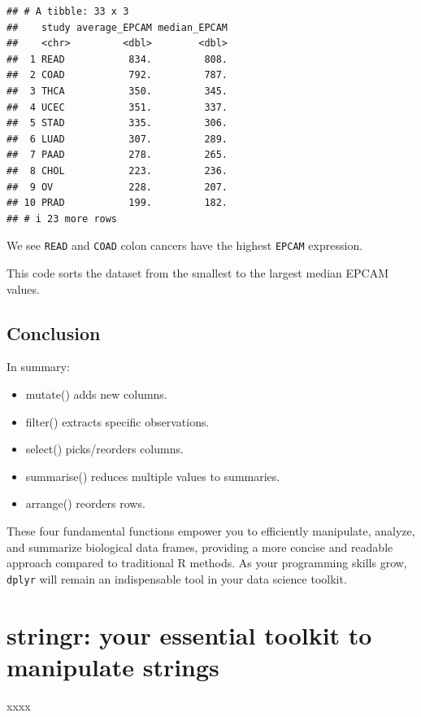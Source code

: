 \documentclass[
]{book}
\begin{document}
\begin{verbatim}
## # A tibble: 33 x 3
##    study average_EPCAM median_EPCAM
##    <chr>         <dbl>        <dbl>
##  1 READ           834.         808.
##  2 COAD           792.         787.
##  3 THCA           350.         345.
##  4 UCEC           351.         337.
##  5 STAD           335.         306.
##  6 LUAD           307.         289.
##  7 PAAD           278.         265.
##  8 CHOL           223.         236.
##  9 OV             228.         207.
## 10 PRAD           199.         182.
## # i 23 more rows
\end{verbatim}

We see \texttt{READ} and \texttt{COAD} colon cancers have the highest \texttt{EPCAM} expression.

This code sorts the dataset from the smallest to the largest median EPCAM values.

\hypertarget{conclusion-19}{%
\subsection{Conclusion}\label{conclusion-19}}

In summary:

\begin{itemize}
\item
  mutate() adds new columns.
\item
  filter() extracts specific observations.
\item
  select() picks/reorders columns.
\item
  summarise() reduces multiple values to summaries.
\item
  arrange() reorders rows.
\end{itemize}

These four fundamental functions empower you to efficiently manipulate, analyze, and summarize biological data frames, providing a more concise and readable approach compared to traditional R methods. As your programming skills grow, \texttt{dplyr} will remain an indispensable tool in your data science toolkit.

\hypertarget{stringr-your-essential-toolkit-to-manipulate-strings}{%
\section{stringr: your essential toolkit to manipulate strings}\label{stringr-your-essential-toolkit-to-manipulate-strings}}

xxxx
\end{document}
